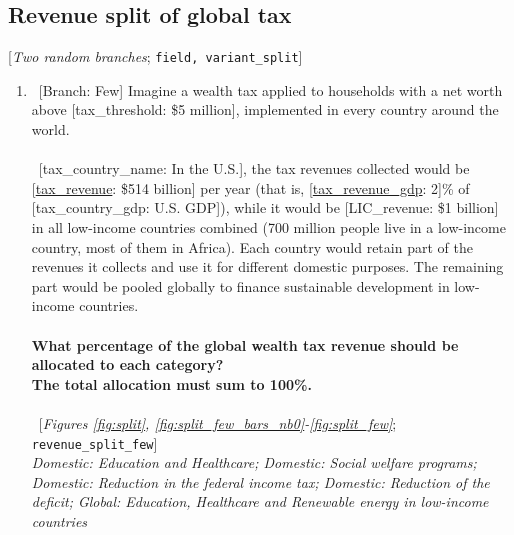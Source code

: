  \subsection*{Revenue split of global tax} 
 [\textit{Two random branches};  \verb|field, variant_split|] 
 \begin{enumerate}[resume] 
\item ~[Branch: Few] \label{q:revenue_split_few} Imagine a wealth tax applied to households with a net worth above [tax\_threshold: \$5 million], implemented in every country around the world.
~\\\\ 
~[tax\_country\_name: In the U.S.], the tax revenues collected would be [\hyperlink{tab_features}{tax\_revenue}: \$514 billion] per year (that is, [\hyperlink{tab_features}{tax\_revenue\_gdp}: 2]\% of [tax\_country\_gdp: U.S. GDP]), while it would be [LIC\_revenue: \$1 billion] in all low-income countries combined (700 million people live in a low-income country, most of them in Africa).
Each country would retain part of the revenues it collects and use it for different domestic purposes. The remaining part would be pooled globally to finance sustainable development in low-income countries.
~\\\\\textbf{What percentage of the global wealth tax revenue should be allocated to each category?} \\\textbf{The total allocation must sum to 100\%.}\\\\ 
~[\textit{Figures \ref{fig:split}, \ref{fig:split_few_bars_nb0}-\ref{fig:split_few}}; 
\verb|revenue_split_few|]
  \\ \textit{Domestic: Education and Healthcare; Domestic: Social welfare programs; Domestic: Reduction in the federal income tax; Domestic: Reduction of the deficit; Global: Education, Healthcare and Renewable energy in low-income countries}


\end{enumerate}
